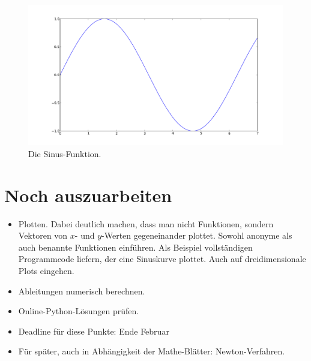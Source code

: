 \documentclass{blatt}
\begin{document}
\begin{figure}
  \centering
  \includegraphics[scale=0.4]{sine-graph}
  \caption{\label{fig:sine-graph}Die Sinus-Funktion.}
\end{figure}



\section{Noch auszuarbeiten}

\begin{itemize}
\item Plotten. Dabei deutlich machen, dass man nicht Funktionen, sondern
Vektoren von $x$- und $y$-Werten gegeneinander plottet. Sowohl anonyme als auch
benannte Funktionen einführen. Als Beispiel vollständigen Programmcode liefern,
der eine Sinuskurve plottet. Auch auf dreidimensionale Plots eingehen.
\item Ableitungen numerisch berechnen.
\item Online-Python-Lösungen prüfen.
\item Deadline für diese Punkte: Ende Februar
\item Für später, auch in Abhängigkeit der Mathe-Blätter: Newton-Verfahren.
\end{itemize}
\end{document}
